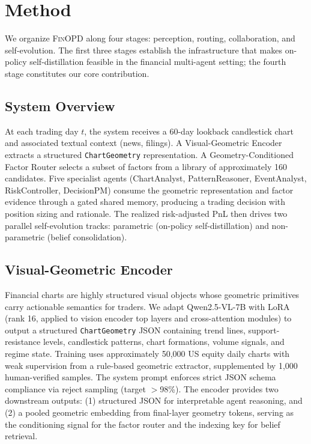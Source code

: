 \section{Method}
\label{sec:method}

We organize \textsc{FinOPD} along four stages: perception, routing, collaboration, and self-evolution. The first three stages establish the infrastructure that makes on-policy self-distillation feasible in the financial multi-agent setting; the fourth stage constitutes our core contribution.

\subsection{System Overview}
\label{sec:overview}

At each trading day $t$, the system receives a 60-day lookback candlestick chart and associated textual context (news, filings). A Visual-Geometric Encoder extracts a structured \texttt{ChartGeometry} representation. A Geometry-Conditioned Factor Router selects a subset of factors from a library of approximately 160 candidates. Five specialist agents (ChartAnalyst, PatternReasoner, EventAnalyst, RiskController, DecisionPM) consume the geometric representation and factor evidence through a gated shared memory, producing a trading decision with position sizing and rationale. The realized risk-adjusted PnL then drives two parallel self-evolution tracks: parametric (on-policy self-distillation) and non-parametric (belief consolidation).

\subsection{Visual-Geometric Encoder}
\label{sec:vge}

Financial charts are highly structured visual objects whose geometric primitives carry actionable semantics for traders. We adapt Qwen2.5-VL-7B with LoRA (rank 16, applied to vision encoder top layers and cross-attention modules) to output a structured \texttt{ChartGeometry} JSON containing trend lines, support-resistance levels, candlestick patterns, chart formations, volume signals, and regime state. Training uses approximately 50,000 US equity daily charts with weak supervision from a rule-based geometric extractor, supplemented by 1,000 human-verified samples. The system prompt enforces strict JSON schema compliance via reject sampling (target $>$98\%). The encoder provides two downstream outputs: (1) structured JSON for interpretable agent reasoning, and (2) a pooled geometric embedding from final-layer geometry tokens, serving as the conditioning signal for the factor router and the indexing key for belief retrieval.

